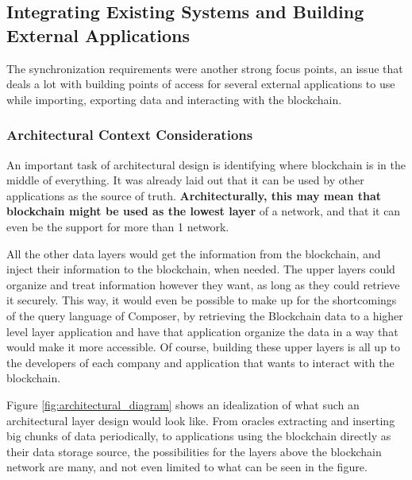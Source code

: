 
\subsection{Integrating Existing Systems and Building External Applications}

The synchronization requirements were another strong focus points, an issue that deals a lot with building points of access for several external applications to use while importing, exporting data and interacting with the blockchain.

\subsubsection*{Architectural Context Considerations}

An important task of architectural design is identifying where blockchain is in the middle of everything. It was already laid out that it can be used by other applications as the source of truth. \textbf{Architecturally, this may mean that blockchain might be used as the lowest layer} of a network, and that it can even be the support for more than 1 network. 

All the other data layers would get the information from the blockchain, and inject their information to the blockchain, when needed. The upper layers could organize and treat information however they want, as long as they could retrieve it securely. This way, it would even be possible to make up for the shortcomings of the query language of Composer, by retrieving the Blockchain data to a higher level layer application and have that application organize the data in a way that would make it more accessible. Of course, building these upper layers is all up to the developers of each company and application that wants to interact with the blockchain. 

Figure \ref{fig:architectural_diagram} shows an idealization of what such an architectural layer design would look like. From oracles extracting and inserting big chunks of data periodically, to applications using the blockchain directly as their data storage source, the possibilities for the layers above the blockchain network are many, and not even limited to what can be seen in the figure.

